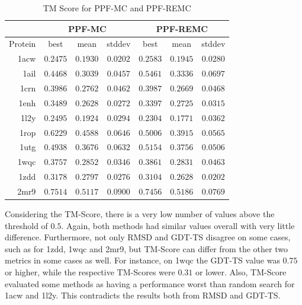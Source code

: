 \begin{table}
  \centering
  \begin{tabular}{r|c|c|c||c|c|c}
            & \multicolumn{3}{c}{PPF-MC} & \multicolumn{3}{||c}{PPF-REMC} \\ \hline
    Protein & best          & mean          & stddev   & best          & mean          & stddev   \\ \hline \hline
    1acw    & $0.2475$      & $0.1930$      & $0.0202$ & $0.2583$      & $0.1945$      & $0.0280$ \\ \hline
    1ail    & $0.4468$      & $0.3039$      & $0.0457$ & $\bm{0.5461}$ & $0.3336$      & $0.0697$ \\ \hline
    1crn    & $0.3986$      & $0.2762$      & $0.0462$ & $0.3987$      & $0.2669$      & $0.0468$ \\ \hline
    1enh    & $0.3489$      & $0.2628$      & $0.0272$ & $0.3397$      & $0.2725$      & $0.0315$ \\ \hline
    1l2y    & $0.2495$      & $0.1924$      & $0.0294$ & $0.2304$      & $0.1771$      & $0.0362$ \\ \hline
    1rop    & $\bm{0.6229}$ & $0.4588$      & $0.0646$ & $\bm{0.5006}$ & $0.3915$      & $0.0565$ \\ \hline
    1utg    & $0.4938$      & $0.3676$      & $0.0632$ & $\bm{0.5154}$ & $0.3756$      & $0.0506$ \\ \hline
    1wqc    & $0.3757$      & $0.2852$      & $0.0346$ & $0.3861$      & $0.2831$      & $0.0463$ \\ \hline
    1zdd    & $0.3178$      & $0.2797$      & $0.0276$ & $0.3104$      & $0.2628$      & $0.0202$ \\ \hline
    2mr9    & $\bm{0.7514}$ & $\bm{0.5117}$ & $0.0900$ & $\bm{0.7456}$ & $\bm{0.5186}$ & $0.0769$ \\ \hline
  \end{tabular}
  \caption{TM Score for PPF-MC and PPF-REMC}
  \label{tab:tmscore-data}
\end{table}

Considering the TM-Score, there is a very low number of values above the
threshold of $0.5$. Again, both methods had similar values overall with very
little difference. Furthermore, not only RMSD and GDT-TS disagree on some cases,
such as for 1zdd, 1wqc and 2mr9, but
TM-Score can differ from the other two metrics in some cases as well. For
instance, on 1wqc the GDT-TS value was $0.75$ or higher, while the respective
TM-Scores were $0.31$ or lower. Also, TM-Score evaluated some methods as having
a performance worst than random search for 1acw and 1l2y. This contradicts the results
both from RMSD and GDT-TS.

